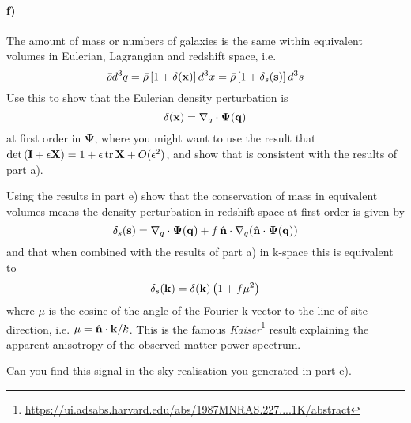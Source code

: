 \documentclass[12pt]{article}
\begin{document}
\paragraph{f)} The amount of mass or numbers of galaxies is the same within equivalent volumes in Eulerian, Lagrangian and redshift space, i.e.
\begin{equation}
    \bar{\rho} d^3q = \bar{\rho} \left[ 1 + \delta({\boldsymbol{\mathbf{x}}})\right] d^3x = \bar{\rho} \left[ 1 + \delta_s({\boldsymbol{\mathbf{s}}})\right] d^3s
\end{equation}
Use this to show that the Eulerian density perturbation is
\begin{equation}
    \delta({\boldsymbol{\mathbf{x}}}) = \nabla_q \cdot \mathbf{\Psi}({\boldsymbol{\mathbf{q}}})
\end{equation}
at first order in $\mathbf{\Psi}$, where you might want to use the result that $\det{({\boldsymbol{\mathbf{I}}}+ \epsilon {\boldsymbol{\mathbf{X}}})} = 1 + \epsilon \operatorname{tr}{{\boldsymbol{\mathbf{X}}}} + O(\epsilon^2)$, and show that is consistent with the results of part a).

Using the results in part e) show that the conservation of mass in equivalent volumes means the density perturbation in redshift space at first order is given by
\begin{equation}
    \delta_s({\boldsymbol{\mathbf{s}}}) = \nabla_q \cdot \mathbf{\Psi}({\boldsymbol{\mathbf{q}}}) + f \, \hat{{\boldsymbol{\mathbf{n}}}} \cdot \nabla_q (\hat{{\boldsymbol{\mathbf{n}}}} \cdot \mathbf{\Psi}({\boldsymbol{\mathbf{q}}}))
\end{equation}
and that when combined with the results of part a) in k-space this is equivalent to
\begin{equation}
    \delta_s({\boldsymbol{\mathbf{k}}}) = \delta({\boldsymbol{\mathbf{k}}}) \left( 1 + f \mu^2 \right)
\end{equation}
where $\mu$ is the cosine of the angle of the Fourier k-vector to the line of site direction, i.e. $\mu = \hat{{\boldsymbol{\mathbf{n}}}} \cdot {\boldsymbol{\mathbf{k}}} / k$. This is the famous \emph{Kaiser}\footnote{\url{https://ui.adsabs.harvard.edu/abs/1987MNRAS.227....1K/abstract}} result explaining the apparent anisotropy of the observed matter power spectrum.

Can you find this signal in the sky realisation you generated in part e).
\end{document}
